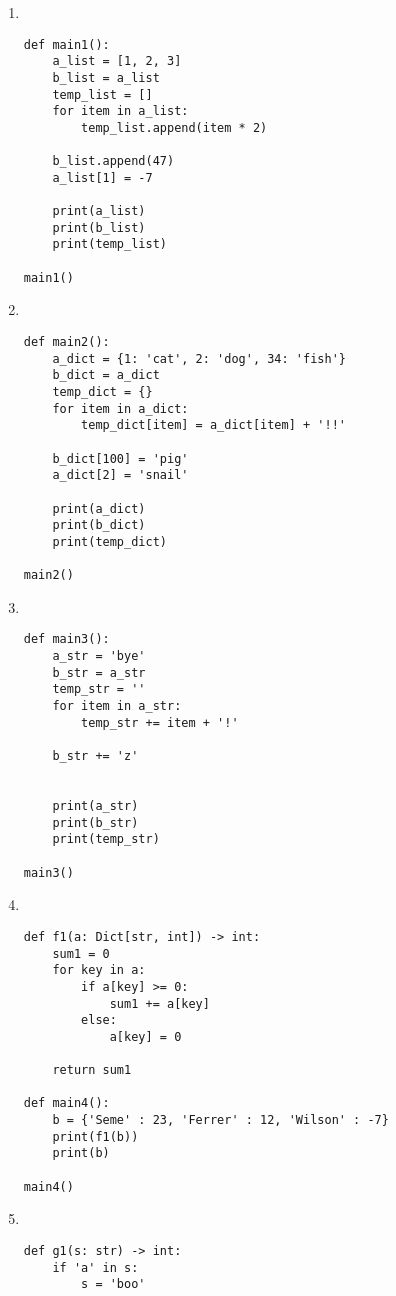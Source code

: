 \documentclass{article}
\begin{document}
\begin{enumerate}

\item  \

\begin{verbatim}
def main1():
    a_list = [1, 2, 3]
    b_list = a_list
    temp_list = []
    for item in a_list:
        temp_list.append(item * 2)

    b_list.append(47)
    a_list[1] = -7

    print(a_list)
    print(b_list)
    print(temp_list)

main1()
\end{verbatim}
\newpage

\item  \ 

\begin{verbatim}
def main2():
    a_dict = {1: 'cat', 2: 'dog', 34: 'fish'}
    b_dict = a_dict
    temp_dict = {}
    for item in a_dict:
        temp_dict[item] = a_dict[item] + '!!'

    b_dict[100] = 'pig'
    a_dict[2] = 'snail'

    print(a_dict)
    print(b_dict)
    print(temp_dict)

main2()
\end{verbatim}
\vfill

\item \ 
\begin{verbatim}
def main3():
    a_str = 'bye'
    b_str = a_str
    temp_str = ''
    for item in a_str:
        temp_str += item + '!'

    b_str += 'z'


    print(a_str)
    print(b_str)
    print(temp_str)

main3()
\end{verbatim}
\vfill
\vfill
\newpage

\item \ 

\begin{verbatim}
def f1(a: Dict[str, int]) -> int:
    sum1 = 0
    for key in a:
        if a[key] >= 0:
            sum1 += a[key]
        else:
            a[key] = 0

    return sum1

def main4():
    b = {'Seme' : 23, 'Ferrer' : 12, 'Wilson' : -7}
    print(f1(b))
    print(b)

main4()
\end{verbatim}
\vfill

\item \ 
\begin{verbatim}
def g1(s: str) -> int:
    if 'a' in s:
        s = 'boo'


\end{verbatim}
\end{enumerate}
\end{document}
